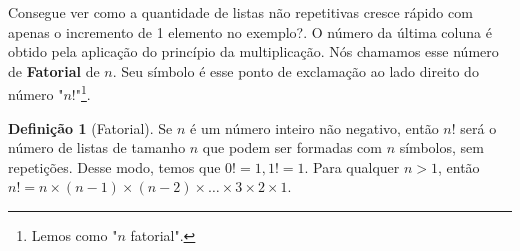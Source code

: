 \documentclass[a4paper,11pt]{book}
\theoremstyle{definition}
\theoremstyle{break}
\newtheorem{definition}{Definição}[section]
\begin{document}
Consegue ver como a quantidade de listas não repetitivas cresce rápido com apenas o incremento de 1 elemento no exemplo?. O número da última coluna é obtido pela aplicação do princípio da multiplicação. Nós chamamos esse número de \textbf{Fatorial} de $n$. Seu símbolo é esse ponto de exclamação ao lado direito do número "$n!$"\footnote{Lemos como "$n$ fatorial".}.

\begin{definition}[Fatorial]
Se $n$ é um número inteiro não negativo, então $n!$ será o número de listas de tamanho $n$ que podem ser formadas com $n$ símbolos, sem repetições. Desse modo, temos que $0! = 1, 1! = 1$. Para qualquer $n > 1$, então $n! = n \times (n - 1) \times (n - 2) \times \dots \times 3 \times 2 \times 1 $.
\end{definition}
\end{document}
